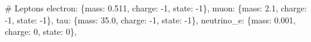 \documentclass[
  11pt,
  letterpaper,
  twoside,
  openany]{book}
\newenvironment{Shaded}{\begin{snugshade}}{\end{snugshade}}
\newcommand{\CommentTok}[1]{\textcolor[rgb]{0.37,0.37,0.37}{#1}}
\newcommand{\DecValTok}[1]{\textcolor[rgb]{0.68,0.00,0.00}{#1}}
\newcommand{\FloatTok}[1]{\textcolor[rgb]{0.68,0.00,0.00}{#1}}
\newcommand{\NormalTok}[1]{\textcolor[rgb]{0.00,0.23,0.31}{#1}}
\newcommand{\OperatorTok}[1]{\textcolor[rgb]{0.37,0.37,0.37}{#1}}
\newcommand{\StringTok}[1]{\textcolor[rgb]{0.13,0.47,0.30}{#1}}
\begin{document}
\begin{Shaded}
\begin{Highlighting}[]
    \CommentTok{\# Leptons}
    \StringTok{\textquotesingle{}electron\textquotesingle{}}\NormalTok{: \{}\StringTok{\textquotesingle{}mass\textquotesingle{}}\NormalTok{: }\FloatTok{0.511}\NormalTok{, }\StringTok{\textquotesingle{}charge\textquotesingle{}}\NormalTok{: }\OperatorTok{{-}}\DecValTok{1}\NormalTok{, }\StringTok{\textquotesingle{}state\textquotesingle{}}\NormalTok{: }\OperatorTok{{-}}\DecValTok{1}\NormalTok{\},}
    \StringTok{\textquotesingle{}muon\textquotesingle{}}\NormalTok{: \{}\StringTok{\textquotesingle{}mass\textquotesingle{}}\NormalTok{: }\FloatTok{2.1}\NormalTok{, }\StringTok{\textquotesingle{}charge\textquotesingle{}}\NormalTok{: }\OperatorTok{{-}}\DecValTok{1}\NormalTok{, }\StringTok{\textquotesingle{}state\textquotesingle{}}\NormalTok{: }\OperatorTok{{-}}\DecValTok{1}\NormalTok{\},}
    \StringTok{\textquotesingle{}tau\textquotesingle{}}\NormalTok{: \{}\StringTok{\textquotesingle{}mass\textquotesingle{}}\NormalTok{: }\FloatTok{35.0}\NormalTok{, }\StringTok{\textquotesingle{}charge\textquotesingle{}}\NormalTok{: }\OperatorTok{{-}}\DecValTok{1}\NormalTok{, }\StringTok{\textquotesingle{}state\textquotesingle{}}\NormalTok{: }\OperatorTok{{-}}\DecValTok{1}\NormalTok{\},}
    \StringTok{\textquotesingle{}neutrino\_e\textquotesingle{}}\NormalTok{: \{}\StringTok{\textquotesingle{}mass\textquotesingle{}}\NormalTok{: }\FloatTok{0.001}\NormalTok{, }\StringTok{\textquotesingle{}charge\textquotesingle{}}\NormalTok{: }\DecValTok{0}\NormalTok{, }\StringTok{\textquotesingle{}state\textquotesingle{}}\NormalTok{: }\DecValTok{0}\NormalTok{\},}


\end{Highlighting}
\end{Shaded}
\end{document}
